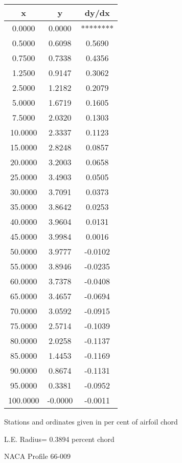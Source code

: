 \documentclass[11pt]{book}
\begin{document}
 \vspace{8mm}
 \begin{tabular}{|c|c|c|} \hline 
  x  &  y  &  dy/dx \\
 \hline
0.0000 & 0.0000 & ******** \\
0.5000 & 0.6098 & 0.5690 \\
0.7500 & 0.7338 & 0.4356 \\
1.2500 & 0.9147 & 0.3062 \\
2.5000 & 1.2182 & 0.2079 \\
5.0000 & 1.6719 & 0.1605 \\
7.5000 & 2.0320 & 0.1303 \\
10.0000 & 2.3337 & 0.1123 \\
15.0000 & 2.8248 & 0.0857 \\
20.0000 & 3.2003 & 0.0658 \\
25.0000 & 3.4903 & 0.0505 \\
30.0000 & 3.7091 & 0.0373 \\
35.0000 & 3.8642 & 0.0253 \\
40.0000 & 3.9604 & 0.0131 \\
45.0000 & 3.9984 & 0.0016 \\
50.0000 & 3.9777 & -0.0102 \\
55.0000 & 3.8946 & -0.0235 \\
60.0000 & 3.7378 & -0.0408 \\
65.0000 & 3.4657 & -0.0694 \\
70.0000 & 3.0592 & -0.0915 \\
75.0000 & 2.5714 & -0.1039 \\
80.0000 & 2.0258 & -0.1137 \\
85.0000 & 1.4453 & -0.1169 \\
90.0000 & 0.8674 & -0.1131 \\
95.0000 & 0.3381 & -0.0952 \\
100.0000 & -0.0000 & -0.0011 \\
 \hline
 \end{tabular}
 \vspace{8mm}


Stations and ordinates given in per cent of airfoil chord 


L.E. Radius=  0.3894 percent chord
 \newpage
  \label{p66-009}
 \begin{Large}
 NACA Profile 66-009
 \end{Large}
  
\end{document}
